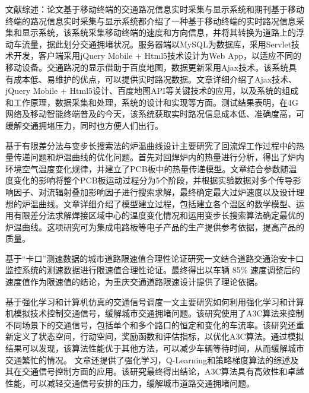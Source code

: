 \documentclass[a4paper,12pt]{article}
\numberwithin{equation}{section}
\newcommand{\upcite}[1]{\textsuperscript{\textsuperscript{\cite{#1}}}}
\begin{document}
	文献综述：论文基于移动终端的交通路况信息实时采集与显示系统和期刊基于移动终端的路况信息实时采集与显示系统都介绍了一种基于移动终端的实时路况信息采集和显示系统，该系统采集移动终端的速度和方向信息，并将其转换为道路上的浮动车流量，据此划分交通拥堵状况。服务器端以MySQL为数据库，采用Servlet技术开发，客户端采用jQuery Mobile + Html5技术设计为Web App，以适应不同的移动设备。交通路况的显示借助于百度地图，数据更新采用Ajax技术。该系统具有成本低、易维护的优点，可以提供实时路况数据。文章详细介绍了Ajax技术、jQuery Mobile + Html5设计、百度地图API等关键技术的应用，以及系统的组成和工作原理，数据采集和处理，系统的设计和实现等方面。测试结果表明，在4G网络及移动智能终端普及的今天，该系统获取实时路况信息成本低、准确度高，可缓解交通拥堵压力，同时也方便人们出行\upcite{ref1,ref2}。\par 	
	基于有限差分法与变步长搜索法的炉温曲线设计主要研究了回流焊工作过程中的热量传递问题和炉温曲线的优化问题。首先对回焊炉内的热量进行分析，得出了炉内环境空气温度变化规律，并建立了PCB板中的热量传递模型。文章结合参数随温度变化的影响将整个PCB板运动过程分为5个阶段，并根据实验数据对多个传导影响因子、对流辐射叠加影响因子进行搜索求解，最终确定最大过炉速度以及设计理想的炉温曲线。文章详细介绍了模型建立过程，包括建立各个温区的数学模型、运用有限差分法求解焊接区域中心的温度变化情况和运用变步长搜索算法确定最优的炉温曲线。这项研究可为集成电路板等电子产品的生产提供参考依据，提高产品的质量。\upcite{ref3}\par
	基于“卡口”测速数据的城市道路限速值合理性论证研究一文结合道路交通治安卡口监控系统的测速数据进行限速值合理性论证。最终得出以车辆 85\% 速度调整后的速度值作为限速值的结论，为重庆交通道路限速设计提供了理论依据。\upcite{ref4}\par
	基于强化学习和计算机仿真的交通信号调度一文主要研究如何利用强化学习和计算机模拟技术控制交通信号，缓解城市交通拥堵问题。该研究使用了A3C算法来控制不同场景下的交通信号，包括单个和多个路口的恒定和变化的车流率。该研究还重新定义了状态空间，行动空间，奖励函数和评估指标，以优化A3C算法。通过模拟结果可以发现，该算法性能优于其他方法，可以减少车辆等待时间，从而缓解城市交通繁忙的情况。
	文章还提供了强化学习，Q-Learning和策略梯度算法的综述及其在交通信号控制方面的应用。该研究最终得出结论，A3C算法具有高效性和卓越性能，可以减轻交通信号安排的压力，缓解城市道路交通拥堵问题。\upcite{ref5}
	
\end{document}
